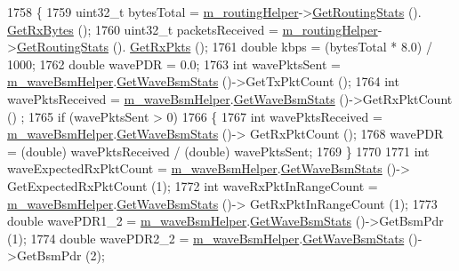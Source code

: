 \begin{DoxyCode}
1758 \{
1759   uint32\_t bytesTotal = \hyperlink{classVanetRoutingExperiment_afbd666dc1310ae1903438ab9073409d5}{m\_routingHelper}->\hyperlink{classRoutingHelper_ae3bfcf80989af6e77fa131d5787302c5}{GetRoutingStats} ().
      \hyperlink{classRoutingStats_a96e1a38d5ecfffeb666c54c4b86bfb73}{GetRxBytes} ();
1760   uint32\_t packetsReceived = \hyperlink{classVanetRoutingExperiment_afbd666dc1310ae1903438ab9073409d5}{m\_routingHelper}->\hyperlink{classRoutingHelper_ae3bfcf80989af6e77fa131d5787302c5}{GetRoutingStats} ().
      \hyperlink{classRoutingStats_ab46561e6214877d39a718fc55f06231b}{GetRxPkts} ();
1761   \textcolor{keywordtype}{double} kbps = (bytesTotal * 8.0) / 1000;
1762   \textcolor{keywordtype}{double} wavePDR = 0.0;
1763   \textcolor{keywordtype}{int} wavePktsSent = \hyperlink{classVanetRoutingExperiment_a690b550804fc4c9bcfab6b8ae40e4728}{m\_waveBsmHelper}.\hyperlink{classns3_1_1WaveBsmHelper_a7b7442d597cc104a22c8c4bef6c98c6e}{GetWaveBsmStats} ()->GetTxPktCount ();
1764   \textcolor{keywordtype}{int} wavePktsReceived = \hyperlink{classVanetRoutingExperiment_a690b550804fc4c9bcfab6b8ae40e4728}{m\_waveBsmHelper}.\hyperlink{classns3_1_1WaveBsmHelper_a7b7442d597cc104a22c8c4bef6c98c6e}{GetWaveBsmStats} ()->GetRxPktCount ()
      ;
1765   \textcolor{keywordflow}{if} (wavePktsSent > 0)
1766     \{
1767       \textcolor{keywordtype}{int} wavePktsReceived = \hyperlink{classVanetRoutingExperiment_a690b550804fc4c9bcfab6b8ae40e4728}{m\_waveBsmHelper}.\hyperlink{classns3_1_1WaveBsmHelper_a7b7442d597cc104a22c8c4bef6c98c6e}{GetWaveBsmStats} ()->
      GetRxPktCount ();
1768       wavePDR = (double) wavePktsReceived / (\textcolor{keywordtype}{double}) wavePktsSent;
1769     \}
1770 
1771   \textcolor{keywordtype}{int} waveExpectedRxPktCount = \hyperlink{classVanetRoutingExperiment_a690b550804fc4c9bcfab6b8ae40e4728}{m\_waveBsmHelper}.\hyperlink{classns3_1_1WaveBsmHelper_a7b7442d597cc104a22c8c4bef6c98c6e}{GetWaveBsmStats} ()->
      GetExpectedRxPktCount (1);
1772   \textcolor{keywordtype}{int} waveRxPktInRangeCount = \hyperlink{classVanetRoutingExperiment_a690b550804fc4c9bcfab6b8ae40e4728}{m\_waveBsmHelper}.\hyperlink{classns3_1_1WaveBsmHelper_a7b7442d597cc104a22c8c4bef6c98c6e}{GetWaveBsmStats} ()->
      GetRxPktInRangeCount (1);
1773   \textcolor{keywordtype}{double} wavePDR1\_2 = \hyperlink{classVanetRoutingExperiment_a690b550804fc4c9bcfab6b8ae40e4728}{m\_waveBsmHelper}.\hyperlink{classns3_1_1WaveBsmHelper_a7b7442d597cc104a22c8c4bef6c98c6e}{GetWaveBsmStats} ()->GetBsmPdr (1);
1774   \textcolor{keywordtype}{double} wavePDR2\_2 = \hyperlink{classVanetRoutingExperiment_a690b550804fc4c9bcfab6b8ae40e4728}{m\_waveBsmHelper}.\hyperlink{classns3_1_1WaveBsmHelper_a7b7442d597cc104a22c8c4bef6c98c6e}{GetWaveBsmStats} ()->GetBsmPdr (2);

\end{DoxyCode}
